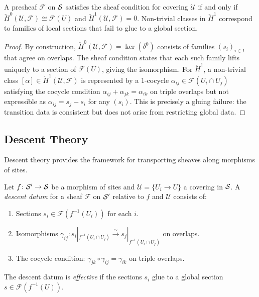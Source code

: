 \documentclass[11pt]{article}
\newcommand{\GluingMap}{\gamma}                      %
\begin{document}
\begin{proposition}\label{prop:obstruction-interp}
A presheaf $\mathcal{F}$ on $\mathcal{S}$ satisfies the sheaf condition for
covering $\mathcal{U}$ if and only if
$\check{H}^0(\mathcal{U}, \mathcal{F}) \cong \mathcal{F}(U)$ and
$\check{H}^1(\mathcal{U}, \mathcal{F}) = 0$.  Non-trivial classes in
$\check{H}^1$ correspond to families of local sections that fail to
glue to a global section.
\end{proposition}

\begin{proof}
By construction, $\check{H}^0(\mathcal{U}, \mathcal{F}) =
\ker(\delta^0)$ consists of families $(s_i)_{i \in I}$ that agree on
overlaps.  The sheaf condition states that each such family lifts
uniquely to a section of $\mathcal{F}(U)$, giving the isomorphism.
For $\check{H}^1$, a non-trivial class $[\alpha] \in
\check{H}^1(\mathcal{U}, \mathcal{F})$ is represented by a $1$-cocycle
$\alpha_{ij} \in \mathcal{F}(U_i \cap U_j)$ satisfying the cocycle
condition $\alpha_{ij} + \alpha_{jk} = \alpha_{ik}$ on triple overlaps
but not expressible as $\alpha_{ij} = s_j - s_i$ for any $(s_i)$.
This is precisely a gluing failure: the transition data is consistent
but does not arise from restricting global data.
\end{proof}

\subsection{Descent Theory}\label{ssec:descent}

Descent theory provides the framework for transporting sheaves along
morphisms of sites.

\begin{definition}\label{def:descent-datum}
Let $f \colon \mathcal{S}' \to \mathcal{S}$ be a morphism of sites and
$\mathcal{U} = \{U_i \to U\}$ a covering in $\mathcal{S}$.  A
\emph{descent datum} for a sheaf $\mathcal{F}$ on $\mathcal{S}'$ relative to
$f$ and $\mathcal{U}$ consists of:
\begin{enumerate}[noitemsep]
  \item Sections $s_i \in \mathcal{F}(f^{-1}(U_i))$ for each $i$.
  \item Isomorphisms $\GluingMap_{ij} \colon s_i|_{f^{-1}(U_i \cap U_j)}
        \xrightarrow{\sim} s_j|_{f^{-1}(U_i \cap U_j)}$ on overlaps.
  \item The cocycle condition: $\GluingMap_{jk} \circ \GluingMap_{ij} =
        \GluingMap_{ik}$ on triple overlaps.
\end{enumerate}
The descent datum is \emph{effective} if the sections $s_i$ glue to a
global section $s \in \mathcal{F}(f^{-1}(U))$.
\end{definition}
\end{document}
